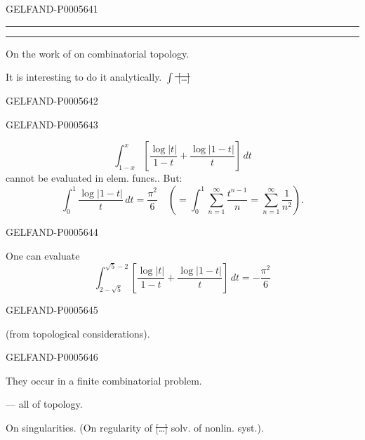 \begin{GelfandAdjacentEvidence}{GELFAND-P000564}{1}
\noindent\hfill\rule{1.35cm}{.28pt}\enspace\rule{.55cm}{.40pt}\hfill\mbox{}\par
{}\qquad{}

On the work of  on combinatorial topology.

It is interesting to do it analytically.
\sout{\mbox{$\int$} […]}
\end{GelfandAdjacentEvidence}
\begin{GelfandAdjacentEvidence}{GELFAND-P000564}{2}

\end{GelfandAdjacentEvidence}
\begin{GelfandAdjacentEvidence}{GELFAND-P000564}{3}

\[
\int_{1-x}^{x}\left[\frac{\log|t|}{1-t}+\frac{\log|1-t|}{t}\right]\,dt
\]
cannot be evaluated in elem. funcs.. But:
\[
\int_0^1\frac{\log|1-t|}{t}\,dt=\frac{\pi^2}{6}
\quad\left(=\int_0^1\sum_{n=1}^{\infty}\frac{t^{n-1}}n
=\sum_{n=1}^{\infty}\frac1{n^2}\right).
\]
\end{GelfandAdjacentEvidence}
\begin{GelfandAdjacentEvidence}{GELFAND-P000564}{4}

One can evaluate
\[
\int_{2-\sqrt5}^{\sqrt5-2}\left[\frac{\log|t|}{1-t}+\frac{\log|1-t|}{t}\right]\,dt
=-\frac{\pi^2}{6}
\]
\end{GelfandAdjacentEvidence}
\begin{GelfandAdjacentEvidence}{GELFAND-P000564}{5}

(from topological considerations).
\end{GelfandAdjacentEvidence}
\begin{GelfandAdjacentEvidence}{GELFAND-P000564}{6}

They occur in a finite combinatorial problem.

 — all of topology.

 On singularities. (On regularity of \sout{[…]} solv. of nonlin. syst.).
\end{GelfandAdjacentEvidence}
